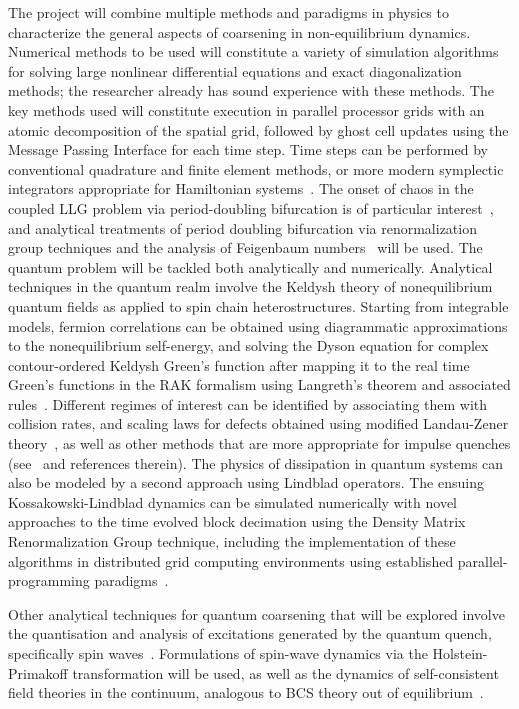 \documentclass[a4paper,11pt,color]{article}
\begin{document}
The project will combine  multiple methods and paradigms in physics to characterize the general aspects of coarsening in non-equilibrium dynamics. Numerical methods to be used will constitute a variety of simulation algorithms for solving  large nonlinear differential equations and exact diagonalization methods; the researcher already has sound experience with these methods. The key methods used will constitute execution in parallel processor grids with an atomic decomposition of the spatial grid, followed by ghost cell updates using the Message Passing Interface for each time step. Time steps can be performed by conventional quadrature and finite element methods, or more modern symplectic integrators appropriate for Hamiltonian systems~\cite{symplectic}.   {The onset of chaos in the coupled LLG problem via period-doubling bifurcation is of particular interest}~\cite{gll:review}, and analytical treatments of period doubling bifurcation via renormalization group techniques and the analysis of Feigenbaum numbers~\cite{hilborn} will be used. The quantum problem will be tackled both analytically and numerically. Analytical techniques in the quantum realm involve the Keldysh theory of nonequilibrium quantum fields as applied to spin chain heterostructures. Starting from integrable models, fermion correlations can be obtained using diagrammatic approximations to the nonequilibrium self-energy, and solving the Dyson equation for complex contour-ordered Keldysh Green's function after mapping it to the real time Green's functions in the RAK formalism using Langreth's theorem and associated rules~\cite{rammer, arrachea}. Different regimes of interest can be identified by associating them with collision rates, and scaling laws for defects obtained  using modified Landau-Zener theory~\cite{fermidyn}, as well as other methods that are more appropriate for 
impulse quenches (see~\cite{ncnsd2012} and references therein). The physics of dissipation in quantum systems can also be modeled by a second approach using Lindblad operators. The ensuing Kossakowski-Lindblad dynamics  can be simulated numerically with novel approaches to the time evolved block decimation using the Density Matrix Renormalization Group technique, including the implementation of these algorithms in distributed grid computing environments using established parallel-programming paradigms~\cite{white:pdmrg}. 

Other analytical techniques for quantum coarsening that will be explored involve the quantisation and analysis of excitations generated by the quantum quench, specifically spin waves~\cite{silva1}. Formulations of spin-wave dynamics via the Holstein-Primakoff transformation will be used, as well as the dynamics of self-consistent field theories in the continuum, analogous to BCS theory out of equilibrium~\cite{gambassi,gambassi:on,silva2}.
\end{document}
